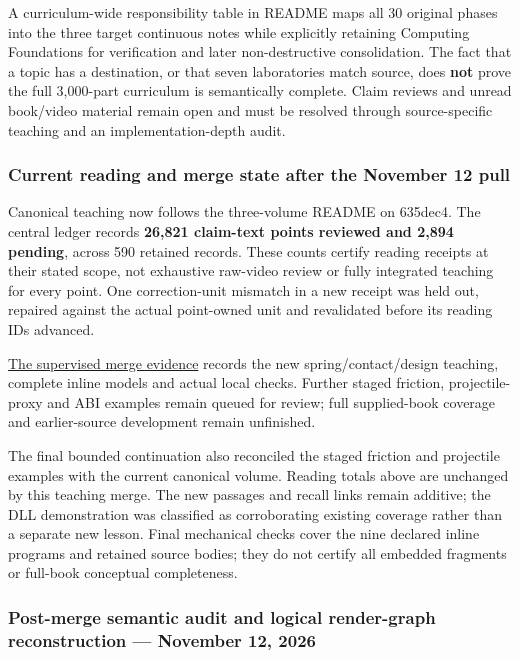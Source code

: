 A curriculum-wide responsibility table in README maps all 30 original phases into the three target continuous notes while explicitly retaining Computing Foundations for verification and later non-destructive consolidation. The fact that a topic has a destination, or that seven laboratories match source, does \textbf{not} prove the full 3,000-part curriculum is semantically complete. Claim reviews and unread book/video material remain open and must be resolved through source-specific teaching and an implementation-depth audit.

\subsubsection{Current reading and merge state after the November 12 pull}\label{appendix-3b67654799a2-current-reading-and-merge-state-after-the-november-12-pull}

Canonical teaching now follows the three-volume README on 635dec4. The central ledger records \textbf{26,821 claim-text points reviewed and 2,894 pending}, across 590 retained records. These counts certify reading receipts at their stated scope, not exhaustive raw-video review or fully integrated teaching for every point. One correction-unit mismatch in a new receipt was held out, repaired against the actual point-owned unit and revalidated before its reading IDs advanced.

\hyperref[appendix-a103e7846d21-november-12-pulled-consolidation-supervised-spring-contact-and-design-additions]{The supervised merge evidence} records the new spring/contact/design teaching, complete inline models and actual local checks. Further staged friction, projectile-proxy and ABI examples remain queued for review; full supplied-book coverage and earlier-source development remain unfinished.

The final bounded continuation also reconciled the staged friction and projectile examples with the current canonical volume. Reading totals above are unchanged by this teaching merge. The new passages and recall links remain additive; the DLL demonstration was classified as corroborating existing coverage rather than a separate new lesson. Final mechanical checks cover the nine declared inline programs and retained source bodies; they do not certify all embedded fragments or full-book conceptual completeness.

\subsubsection{Post-merge semantic audit and logical render-graph reconstruction --- November 12, 2026}\label{appendix-3b67654799a2-post-merge-semantic-audit-and-logical-render-graph-reconstruction-november-12-2026}

